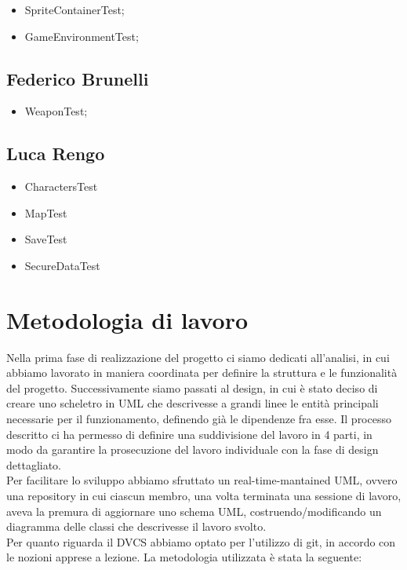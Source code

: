 \begin{itemize}
	\item SpriteContainerTest;
	\item GameEnvironmentTest;
\end{itemize}

\subsection*{Federico Brunelli}
    

\begin{itemize}
	\item WeaponTest;
\end{itemize}

\subsection*{Luca Rengo}

\begin{itemize}
	\item \textsf{\small CharactersTest}
	\item \textsf{\small MapTest}
	\item \textsf{\small SaveTest}
	\item \textsf{\small SecureDataTest}
\end{itemize}



\section{Metodologia di lavoro}

Nella prima fase di realizzazione del progetto ci siamo dedicati all'analisi, in cui abbiamo lavorato in maniera coordinata per definire la struttura e le funzionalità del progetto.
Successivamente siamo passati al design, in cui è stato deciso di creare uno scheletro in UML che descrivesse a grandi linee le entità principali necessarie per il funzionamento, definendo già le dipendenze fra esse. Il processo descritto ci ha permesso di definire una suddivisione del lavoro in 4 parti, in modo da garantire la prosecuzione del lavoro individuale con la fase di design dettagliato. \\
Per facilitare lo sviluppo abbiamo sfruttato un real-time-mantained UML, ovvero una repository in cui ciascun membro, una volta terminata una sessione di lavoro, aveva la premura di aggiornare uno schema UML, costruendo/modificando un diagramma delle classi che descrivesse il lavoro svolto. \\
Per quanto riguarda il DVCS abbiamo optato per l'utilizzo di git, in accordo con le nozioni apprese a lezione. La metodologia utilizzata è stata la seguente:

